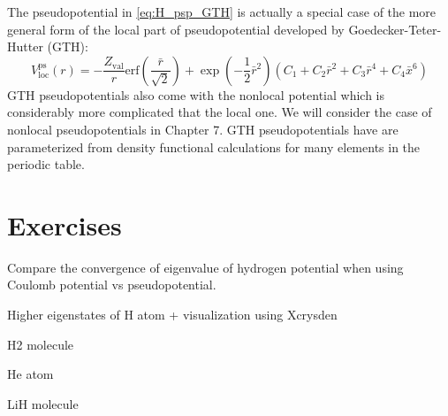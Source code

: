 The pseudopotential in \ref{eq:H_psp_GTH} is actually a special case of the more general
form of the local part of pseudopotential developed by Goedecker-Teter-Hutter (GTH):
\begin{equation}
V^{\mathrm{ps}}_{\mathrm{loc}}(r) = -\frac{Z_{\mathrm{val}}}{r}
\mathrm{erf}\left( \frac{\bar{r}}{\sqrt{2}} \right) +
\exp\left( -\frac{1}{2}\bar{r}^2 \right)
\left( C_{1} + C_{2}\bar{r}^2 + C_{3}\bar{r}^4 + C_{4}\bar{x}^6\right)
\label{eq:V_loc_GTH}
\end{equation}
GTH pseudopotentials also come with the nonlocal potential which is considerably more complicated
that the local one.
We will consider the case of nonlocal pseudopotentials in Chapter 7.
GTH pseudopotentials have are parameterized from density functional calculations for many elements
in the periodic table. 



\section{Exercises}

Compare the convergence of eigenvalue of hydrogen potential when using Coulomb potential
vs pseudopotential.

Higher eigenstates of H atom + visualization using Xcrysden

H2 molecule

He atom

LiH molecule